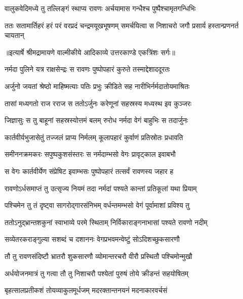 \twolineshloka
{वालुकवेदिमध्ये तु तल्लिङ्गं स्थाप्य रावणः}
{अर्चयामास गन्धैश्च पुष्पैश्चामृतगन्धिभिः} %

\fourlineindentedshloka
{ततः सतामार्तिहरं हरं परं}
{ वरप्रदं चन्द्रमयूखभूषणम्}
{समर्चयित्वा स निशाचरो जगौ}
{ प्रसार्य हस्तान्प्रणनर्त चायतान्} %


{॥इत्यार्षे श्रीमद्रामायणे वाल्मीकीये आदिकाव्ये उत्तरकाण्डे एकत्रिंशः सर्गः॥}


\twolineshloka
{नर्मदा पुलिने यत्र राक्षसेन्द्रः स रावणः}
{पुष्पोपहारं कुरुते तस्माद्देशाददूरतः} %

\twolineshloka
{अर्जुनो जयतां श्रेष्ठो माहिष्मत्याः पतिः प्रभुः}
{क्रीडिते सह नारीभिर्नर्मदातोयमाश्रितः} %

\twolineshloka
{तासां मध्यगतो राज रराज स ततोऽर्जुनः}
{करेणूनां सहस्रस्य मध्यस्थ इव कुञ्जरः} %

\twolineshloka
{जिज्ञासुः स तु बाहूनां सहस्रस्योत्तमं बलम्}
{रुरोध नर्मदा वेगं बाहुभिः स तदार्जुनः} %

\twolineshloka
{कार्तवीर्यभुजासेतुं तज्जलं प्राप्य निर्मलम्}
{कूलापहारं कुर्वाणं प्रतिस्रोतः प्रधावति} %

\twolineshloka
{समीननक्रमकरः सपुष्पकुशसंस्तरः}
{स नर्मदाम्भसो वेगः प्रावृट्काल इवाबभौ} %

\twolineshloka
{स वेगः कार्तवीर्येण संप्रेषिट इवाम्भसः}
{पुष्पोपहारं तत्सर्वं रावणस्य जहार ह} %

\twolineshloka
{रावणोऽर्धसमाप्तं तु उत्सृज्य नियमं तदा}
{नर्मदां पश्यते कान्तां प्रतिकूलां यथा प्रियाम्} %

\twolineshloka
{पश्चिमेन तु तं दृष्ट्वा सागरोद्गारसंनिभम्}
{वर्धन्तमम्भसो वेगं पूर्वामाशां प्रविश्य तु} %

\twolineshloka
{ततोऽनुद्भ्रान्तशकुनां स्वाभाव्ये परमे स्थिताम्}
{निर्विकाराङ्गनाभासां पश्यते रावणो नदीम्} %

\twolineshloka
{सव्येतरकराङ्गुल्या सशब्दं च दशाननः}
{वेगप्रभवमन्वेष्टुं सोऽदिशच्छुकसारणौ} %

\twolineshloka
{तौ तु रावणसंदिष्टौ भ्रातरौ शुकसारणौ}
{व्योमान्तरचरौ वीरौ प्रस्थितौ पश्चिमोन्मुखौ} %

\twolineshloka
{अर्धयोजनमात्रं तु गत्वा तौ तु निशाचरौ}
{पश्येतां पुरुषं तोये क्रीडन्तं सहयोषितम्} %

\twolineshloka
{बृहत्सालप्रतीकशं तोयव्याकुलमूर्धजम्}
{मदरक्तान्तनयनं मदनाकारवर्चसं} %

